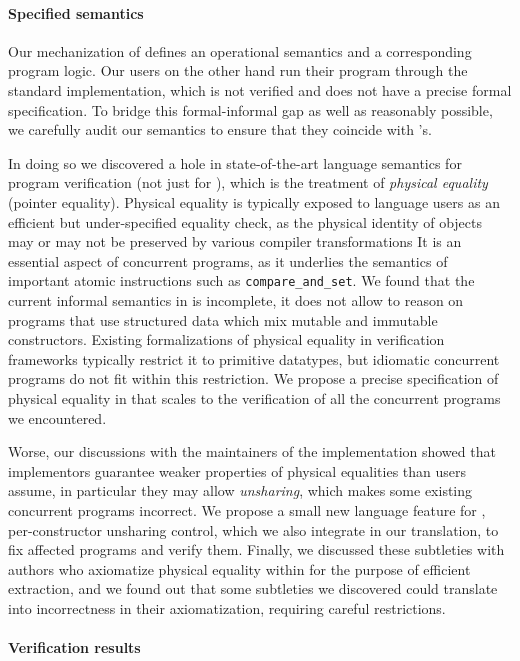 \paragraph{Specified \OCaml semantics}

Our \Iris mechanization of \ZooLang defines an operational semantics and a corresponding program logic. Our users on the other hand run their program through the standard \OCaml implementation, which is not verified and does not have a precise formal specification.
To bridge this formal-informal gap as well as reasonably possible, we carefully audit our \ZooLang semantics to ensure that they coincide with \OCaml's.

In doing so we discovered a hole in state-of-the-art language semantics for program verification (not just for \OCaml), which is the treatment of \emph{physical equality} (pointer equality).
Physical equality is typically exposed to language users as an efficient but under-specified equality check, as the physical identity of objects may or may not be preserved by various compiler transformations
It is an essential aspect of concurrent programs, as it underlies the semantics of important atomic instructions such as \texttt{compare\_and\_set}.
We found that the current informal semantics in \OCaml is incomplete, it does not allow to reason on programs that use structured data which mix mutable and immutable constructors.
Existing formalizations of physical equality in verification frameworks typically restrict it to primitive datatypes, but idiomatic concurrent programs do not fit within this restriction.
We propose a precise specification of physical equality in \Zoo that scales to the verification of all the concurrent programs we encountered.

Worse, our discussions with the maintainers of the \OCaml implementation showed that implementors guarantee weaker properties of physical equalities than users assume, in particular they may allow \emph{unsharing}, which makes some existing concurrent programs incorrect.
We propose a small new language feature for \OCaml, per-constructor unsharing control, which we also integrate in our \ZooLang translation, to fix affected programs and verify them.
Finally, we discussed these subtleties with authors who axiomatize physical equality within \Rocq for the purpose of efficient extraction, and we found out that some subtleties we discovered could translate into incorrectness in their axiomatization, requiring careful restrictions.

\paragraph{Verification results}

